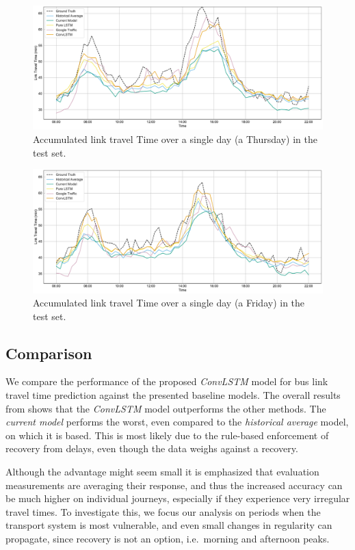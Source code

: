 ﻿\documentclass[preprint,11pt,5p,twocolumn]{elsarticle}
\begin{document}
\begin{figure}
  \centering
  \includegraphics[width=\textwidth]{plots/comparison_day.pdf}
  \caption{Accumulated link travel Time over a single day (a Thursday) in the test set.}
  \label{fig:comparison_day}
\end{figure}
\begin{figure}
  \centering
  \includegraphics[width=\textwidth]{plots/comparison_day_2.pdf}
  \caption{Accumulated link travel Time over a single day (a Friday) in the test set.}
  \label{fig:comparison_day_2}
\end{figure}


\subsection{Comparison}
We compare the performance of the proposed \emph{ConvLSTM} model for bus link travel time prediction against the presented baseline models. The overall results from  shows that the \emph{ConvLSTM} model outperforms the other methods. The \emph{current model} performs the worst, even compared to the \emph{historical average} model, on which it is based. This is most likely due to the rule-based enforcement of recovery from delays, even though the data weighs against a recovery.

Although the advantage might seem small it is emphasized that evaluation measurements are averaging their response, and thus the increased accuracy can be much higher on individual journeys, especially if they experience very irregular travel times. To investigate this, we focus our analysis on periods when the transport system is most vulnerable, and even small changes in regularity can propagate, since recovery is not an option, i.e.\ morning and afternoon peaks.
\end{document}

